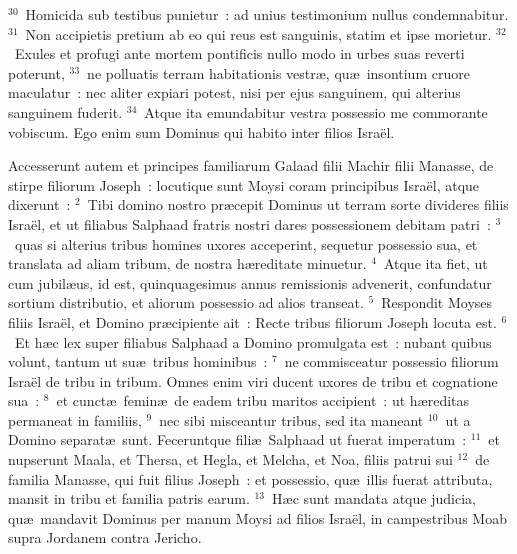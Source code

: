 ${}^{30}$~Homicida sub testibus punietur~: ad unius testimonium nullus condemnabitur.
${}^{31}$~Non accipietis pretium ab eo qui reus est sanguinis, statim et ipse morietur.
${}^{32}$~Exules et profugi ante mortem pontificis nullo modo in urbes suas reverti poterunt,
${}^{33}$~ne polluatis terram habitationis vestr\ae , qu\ae\ insontium cruore maculatur~: nec aliter expiari potest, nisi per ejus sanguinem, qui alterius sanguinem fuderit.
${}^{34}$~Atque ita emundabitur vestra possessio me commorante vobiscum. Ego enim sum Dominus qui habito inter filios Isra\"el.

\lettrine[lines=3,image=true,loversize=0.05,lraise=-0.03]{A}{}ccesserunt autem et principes familiarum Galaad filii Machir filii Manasse, de stirpe filiorum Joseph~: locutique sunt Moysi coram principibus Isra\"el, atque dixerunt~:
${}^{2}$~Tibi domino nostro pr\ae cepit Dominus ut terram sorte divideres filiis Isra\"el, et ut filiabus Salphaad fratris nostri dares possessionem debitam patri~:
${}^{3}$~quas si alterius tribus homines uxores acceperint, sequetur possessio sua, et translata ad aliam tribum, de nostra h\ae reditate minuetur.
${}^{4}$~Atque ita fiet, ut cum jubil\ae us, id est, quinquagesimus annus remissionis advenerit, confundatur sortium distributio, et aliorum possessio ad alios transeat.
${}^{5}$~Respondit Moyses filiis Isra\"el, et Domino pr\ae cipiente ait~: Recte tribus filiorum Joseph locuta est.
${}^{6}$~Et h\ae c lex super filiabus Salphaad a Domino promulgata est~: nubant quibus volunt, tantum ut su\ae\ tribus hominibus~:
${}^{7}$~ne commisceatur possessio filiorum Isra\"el de tribu in tribum. Omnes enim viri ducent uxores de tribu et cognatione sua~:
${}^{8}$~et cunct\ae\ femin\ae\ de eadem tribu maritos accipient~: ut h\ae reditas permaneat in familiis,
${}^{9}$~nec sibi misceantur tribus, sed ita maneant
${}^{10}$~ut a Domino separat\ae\ sunt. Feceruntque fili\ae\ Salphaad ut fuerat imperatum~:
${}^{11}$~et nupserunt Maala, et Thersa, et Hegla, et Melcha, et Noa, filiis patrui sui
${}^{12}$~de familia Manasse, qui fuit filius Joseph~: et possessio, qu\ae\ illis fuerat attributa, mansit in tribu et familia patris earum.
${}^{13}$~H\ae c sunt mandata atque judicia, qu\ae\ mandavit Dominus per manum Moysi ad filios Isra\"el, in campestribus Moab supra Jordanem contra Jericho.
